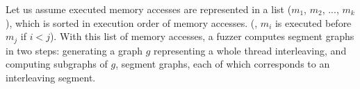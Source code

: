 %


%



%
Let us assume executed memory accesses are represented in a list
($m_1$, $m_2$, ..., $m_k$), which is sorted in execution order of
memory accesses. (\ie, $m_i$ is executed before $m_j$ if $i<j$).
%
With this list of memory accesses, a fuzzer computes segment graphs in
two steps: generating a graph $g$ representing a whole thread
interleaving, and computing subgraphs of $g$, segment graphs, each of
which corresponds to an interleaving segment.



